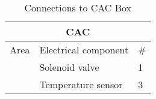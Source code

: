 \begin{table}[H]
\centering

\begin{tabular}{|l|l|l|}
\hline
\multicolumn{3}{|c|}{\textbf{CAC}}                                                                                      \\ \hline
\multicolumn{1}{|c|}{Area}                        & \multicolumn{1}{c|}{Electrical component} & \multicolumn{1}{c|}{\#} \\ \hline
\rowcolor[HTML]{FFCC67} 
\cellcolor[HTML]{FFCC67}                          & Solenoid valve                            & 1                       \\ \cline{2-3} 
\rowcolor[HTML]{FFCC67} 
\multirow{-2}{*}{\cellcolor[HTML]{FFCC67}CAC} & Temperature sensor                        & 3                       \\ \hline
\end{tabular}
\caption{Connections to CAC Box}
\label{tab:list_of_components_CAC}
\end{table}